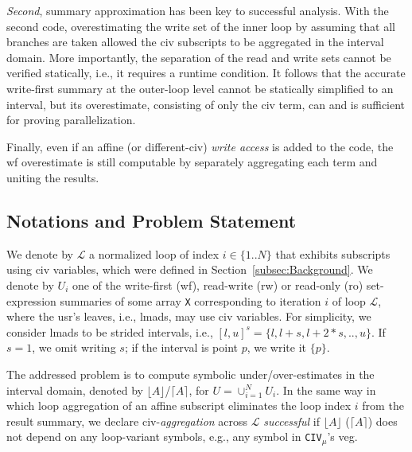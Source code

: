 \documentclass{sig-alternate}
\begin{document}
{\em Second}, summary approximation has been key to successful
analysis. With the second code, overestimating the write set 
of the inner loop by assuming that all branches are taken 
allowed the {\sc civ} subscripts to be aggregated in the 
interval domain. 
More importantly, the separation of the read and write sets cannot 
be verified statically, i.e., it requires a runtime condition. 
%
It follows that the accurate write-first summary at the 
outer-loop level cannot be statically simplified to an interval,
but its overestimate, consisting of only the {\sc civ} term, 
can and is sufficient for proving parallelization.

Finally, even if an affine (or different-{\sc civ})
{\em write access} is added to the code, the {\sc wf} overestimate
is still computable by separately aggregating each
term and uniting the results. %

\subsection{Notations and Problem Statement}
\label{subsec:ProblemHL}

We denote by $\mathcal{L}$ a normalized loop of index $i\in\{1..N\}$ that
exhibits subscripts using {\sc civ} variables, which were defined
in Section~\ref{subsec:Background}. %
%
We denote by $U_i$ one of the write-first ({\sc wf}), read-write ({\sc rw})
or read-only ({\sc ro}) set-expression summaries of some array {\tt X} 
corresponding to iteration $i$ of loop $\mathcal{L}$, where the {\sc usr}'s 
leaves, i.e., {\sc lmad}s, may use {\sc civ} variables. 
%
For simplicity, we consider {\sc lmad}s to be 
strided intervals, i.e., $[l,u]^s=\{l, l+s, l+2*s, .., u\}$.
If $s=1$, we omit writing $s$; if the interval 
is point $p$, we write it $\{p\}$.
  

The addressed problem is to compute symbolic under/over-estimates in the 
interval domain, denoted by $\lfloor A \rfloor$/$\lceil A \rceil$, 
for $U = \cup_{i=1}^{N} U_i$.
%
In the same way in which loop aggregation of an affine subscript  
eliminates the loop index $i$ from the result summary,
we declare {\sc civ}-{\em aggregation} across $\mathcal{L}$ {\em successful} 
if $\lfloor A \rfloor$ ($\lceil A \rceil$) does not depend on any loop-variant
symbols, e.g., any symbol in {\tt CIV}$_{\mu}$'s  {\sc veg}. %
\end{document}
